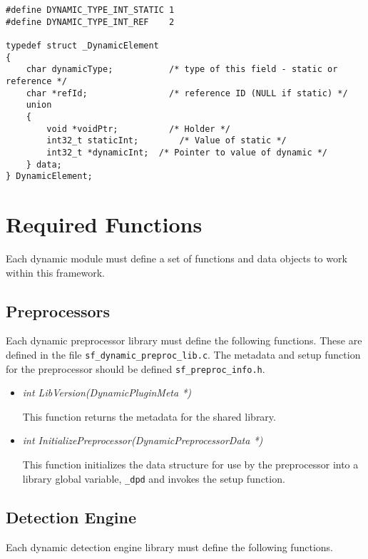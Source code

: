 \documentclass[english]{report}
\begin{document}
\begin{itemize}
\begin{verbatim}
#define DYNAMIC_TYPE_INT_STATIC 1
#define DYNAMIC_TYPE_INT_REF    2

typedef struct _DynamicElement
{
    char dynamicType;           /* type of this field - static or reference */
    char *refId;                /* reference ID (NULL if static) */
    union
    {
        void *voidPtr;          /* Holder */
        int32_t staticInt;        /* Value of static */
        int32_t *dynamicInt;  /* Pointer to value of dynamic */
    } data;
} DynamicElement;
\end{verbatim}

\end{itemize}

\section{Required Functions}

Each dynamic module must define a set of functions and data objects
to work within this framework.

\subsection{Preprocessors}

Each dynamic preprocessor library must define the following functions.  These
are defined in the file \texttt{sf\_dynamic\_preproc\_lib.c}.  The metadata
and setup function for the preprocessor should be defined
\texttt{sf\_preproc\_info.h}.

\begin{itemize}
\item {\em int LibVersion(DynamicPluginMeta *)}

This function returns the metadata for the shared library.

\item {\em int InitializePreprocessor(DynamicPreprocessorData *)}

This function initializes the data structure for use by the preprocessor
into a library global variable, \texttt{\_dpd} and invokes the setup
function.
\end{itemize}

\subsection{Detection Engine}

Each dynamic detection engine library must define the following functions.
\end{document}
